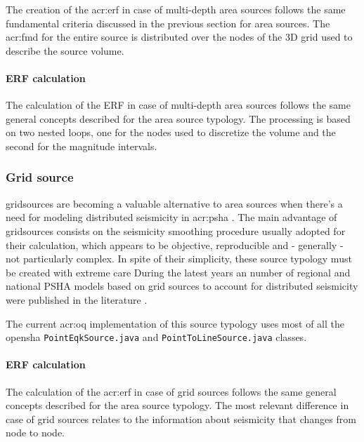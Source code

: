 The creation of the \gls{acr:erf} in case of multi-depth area sources
follows the same fundamental criteria discussed in the previous section 
for area sources. 
%
The \gls{acr:fmd} for the entire source is distributed over the nodes 
of the 3D grid used to describe the source volume.
%
\paragraph{ERF calculation}
The calculation of the ERF in case of multi-depth area sources follows
the same general concepts described for the area source typology.
%
The processing is based on two nested loops, one for the nodes 
used to discretize the volume and the second for the magnitude intervals. 
%
\subsubsection{Grid source}
\Glspl{gridsource} are becoming a valuable alternative
to area sources when there's a need for modeling distributed 
seismicity in \gls{acr:psha} \citep{frankel1995}. 
%
The main advantage of \glspl{gridsource} consists on the seismicity 
smoothing procedure usually adopted for their calculation, which appears
to be objective, reproducible and - generally - not particularly complex. 
%
In spite of their simplicity, these source typology must be created 
with extreme care \citep[][page 9]{abrahamson2006}
%
During the latest years an number of regional and national PSHA models 
based on grid sources to account for distributed seismicity were 
published in the literature \citep{stirling2002,petersen2008}. 

%
The current \gls{acr:oq} implementation of this source typology 
uses most of all the \gls{opensha} \texttt{PointEqkSource.java}
and \texttt{PointToLineSource.java} classes.
%
\paragraph{ERF calculation}
The calculation of the \gls{acr:erf} in case of grid sources follows 
the same general concepts described for the area source typology.
The most relevant difference in case of grid sources relates to the 
information about seismicity that changes from node to node.


